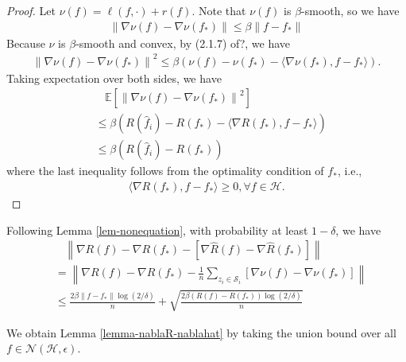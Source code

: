 \documentclass{article}
\begin{document}
\begin{proof}
  Let $\nu(f)=\ell(f,\cdot)+r(f)$.
  Note that $\nu(f)$ is $\beta$-smooth,
  so we have
  \begin{align}
    \|\nabla\nu(f)-\nabla\nu(f_\ast)\| \leq \beta\|f-f_\ast\|
  \end{align}
  Because $\nu$ is $\beta$-smooth and convex, by (2.1.7) of?,
  we have
  \begin{align*}
   \left\|\nabla\nu (f)-\nabla \nu (f_\ast)\right\|^2
    \leq
    \beta\left(\nu (f)-\nu (f_\ast)
    -\langle \nabla\nu (f_\ast), f-f_\ast\rangle \right).
  \end{align*}
  Taking expectation over both sides, we have
  \begin{align*}
    &~~~~\mathbb{E}[\left\|\nabla\nu (f)-\nabla\nu (f_\ast)\right\|^2]\\
    &\leq \beta \left(R(\hat{f}_i)-R(f_\ast)-\langle \nabla R(f_\ast), f-f_\ast\rangle\right)\\
    &\leq \beta \left(R(\hat{f}_i)-R(f_\ast)\right)
  \end{align*}
  where the last inequality follows from the optimality condition of $f_\ast$, i.e.,
  \begin{align*}
    \langle \nabla R(f_\ast),f-f_\ast\rangle \geq 0,\forall f\in\mathcal{H}.
  \end{align*}
\end{proof}
Following Lemma \ref{lem-nonequation}, with probability at least $1-\delta$, we have
\begin{align*}
  &~~~~\left\|
  \nabla R(f)-\nabla R(f_\ast)-[\nabla \hat{R}(f)-\nabla \hat{R}(f_\ast)]
  \right\|\\
  &=\left\|
    \nabla R(f)-\nabla R(f_\ast)
    -\frac{1}{n}\sum_{z_i\in \mathcal{S}_i}
    \left[\nabla \nu(f)-\nabla \nu(f_\ast)\right]
  \right\|\\
  &\leq \frac{2\beta\|f-f_\ast\|\log(2/\delta)}{n}+\sqrt{\frac{2\beta(R(f)-R(f_\ast))\log (2/\delta)}{n}}
\end{align*}

We obtain Lemma \ref{lemma-nablaR-nablahat} by taking the union bound over all $f\in\mathcal{N}(\mathcal{H},\epsilon)$.
\end{document}
